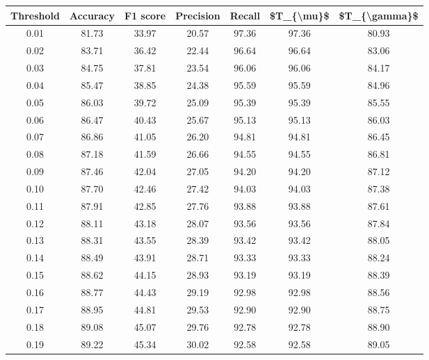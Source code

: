 \begin{tabular}{|c|c|c|c|c|c|c|}
\hline
 Threshold &  Accuracy &  F1 score &  Precision &  Recall &  \$T\_\{\textbackslash mu\}\$ &  \$T\_\{\textbackslash gamma\}\$ \\
\hline
      0.01 &     81.73 &     33.97 &      20.57 &   97.36 &      97.36 &         80.93 \\
      0.02 &     83.71 &     36.42 &      22.44 &   96.64 &      96.64 &         83.06 \\
      0.03 &     84.75 &     37.81 &      23.54 &   96.06 &      96.06 &         84.17 \\
      0.04 &     85.47 &     38.85 &      24.38 &   95.59 &      95.59 &         84.96 \\
      0.05 &     86.03 &     39.72 &      25.09 &   95.39 &      95.39 &         85.55 \\
      0.06 &     86.47 &     40.43 &      25.67 &   95.13 &      95.13 &         86.03 \\
      0.07 &     86.86 &     41.05 &      26.20 &   94.81 &      94.81 &         86.45 \\
      0.08 &     87.18 &     41.59 &      26.66 &   94.55 &      94.55 &         86.81 \\
      0.09 &     87.46 &     42.04 &      27.05 &   94.20 &      94.20 &         87.12 \\
      0.10 &     87.70 &     42.46 &      27.42 &   94.03 &      94.03 &         87.38 \\
      0.11 &     87.91 &     42.85 &      27.76 &   93.88 &      93.88 &         87.61 \\
      0.12 &     88.11 &     43.18 &      28.07 &   93.56 &      93.56 &         87.84 \\
      0.13 &     88.31 &     43.55 &      28.39 &   93.42 &      93.42 &         88.05 \\
      0.14 &     88.49 &     43.91 &      28.71 &   93.33 &      93.33 &         88.24 \\
      0.15 &     88.62 &     44.15 &      28.93 &   93.19 &      93.19 &         88.39 \\
      0.16 &     88.77 &     44.43 &      29.19 &   92.98 &      92.98 &         88.56 \\
      0.17 &     88.95 &     44.81 &      29.53 &   92.90 &      92.90 &         88.75 \\
      0.18 &     89.08 &     45.07 &      29.76 &   92.78 &      92.78 &         88.90 \\
      0.19 &     89.22 &     45.34 &      30.02 &   92.58 &      92.58 &         89.05 \\

\end{tabular}
